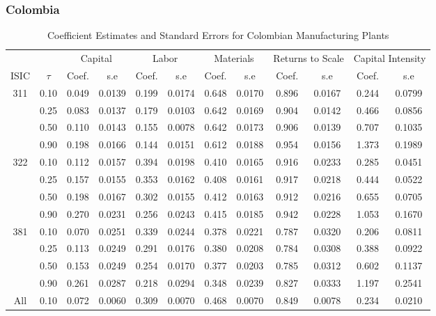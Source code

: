 \documentclass[11pt]{article}
\begin{document}
\subsubsection{Colombia}

\begin{table}[H]
\centering
\caption{Coefficient Estimates and Standard Errors for Colombian Manufacturing Plants}
\begin{tabular}{cccccccccccc}
  \hline\hline & & \multicolumn{2}{c}{Capital}  & \multicolumn{2}{c}{Labor} & \multicolumn{2}{c}{Materials} & \multicolumn{2}{c}{Returns to Scale} & \multicolumn{2}{c}{Capital Intensity}\\ \cmidrule(lr){3-4} \cmidrule(lr){5-6} \cmidrule(lr){7-8} \cmidrule(lr){9-10} \cmidrule(lr){11-12}ISIC & $\tau$ & Coef. & s.e & Coef. & s.e & Coef. & s.e & Coef. & s.e & Coef. & s.e \\ 
  \hline
311 & 0.10 & 0.049 & 0.0139 & 0.199 & 0.0174 & 0.648 & 0.0170 & 0.896 & 0.0167 & 0.244 & 0.0799 \\ 
   & 0.25 & 0.083 & 0.0137 & 0.179 & 0.0103 & 0.642 & 0.0169 & 0.904 & 0.0142 & 0.466 & 0.0856 \\ 
   & 0.50 & 0.110 & 0.0143 & 0.155 & 0.0078 & 0.642 & 0.0173 & 0.906 & 0.0139 & 0.707 & 0.1035 \\ 
   & 0.90 & 0.198 & 0.0166 & 0.144 & 0.0151 & 0.612 & 0.0188 & 0.954 & 0.0156 & 1.373 & 0.1989 \\ 
  322 & 0.10 & 0.112 & 0.0157 & 0.394 & 0.0198 & 0.410 & 0.0165 & 0.916 & 0.0233 & 0.285 & 0.0451 \\ 
   & 0.25 & 0.157 & 0.0155 & 0.353 & 0.0162 & 0.408 & 0.0161 & 0.917 & 0.0218 & 0.444 & 0.0522 \\ 
   & 0.50 & 0.198 & 0.0167 & 0.302 & 0.0155 & 0.412 & 0.0163 & 0.912 & 0.0216 & 0.655 & 0.0705 \\ 
   & 0.90 & 0.270 & 0.0231 & 0.256 & 0.0243 & 0.415 & 0.0185 & 0.942 & 0.0228 & 1.053 & 0.1670 \\ 
  381 & 0.10 & 0.070 & 0.0251 & 0.339 & 0.0244 & 0.378 & 0.0221 & 0.787 & 0.0320 & 0.206 & 0.0811 \\ 
   & 0.25 & 0.113 & 0.0249 & 0.291 & 0.0176 & 0.380 & 0.0208 & 0.784 & 0.0308 & 0.388 & 0.0922 \\ 
   & 0.50 & 0.153 & 0.0249 & 0.254 & 0.0170 & 0.377 & 0.0203 & 0.785 & 0.0312 & 0.602 & 0.1137 \\ 
   & 0.90 & 0.261 & 0.0287 & 0.218 & 0.0294 & 0.348 & 0.0239 & 0.827 & 0.0333 & 1.197 & 0.2541 \\ 
  All & 0.10 & 0.072 & 0.0060 & 0.309 & 0.0070 & 0.468 & 0.0070 & 0.849 & 0.0078 & 0.234 & 0.0210 \\ 

\end{tabular}
\end{table}
\end{document}
